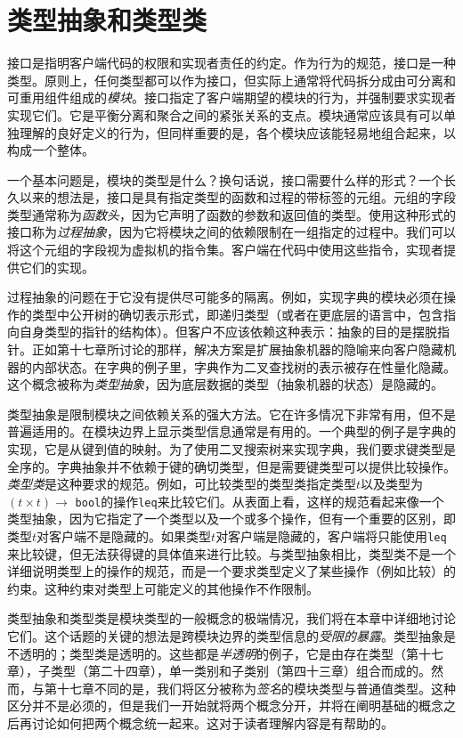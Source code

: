 
\chapter{类型抽象和类型类}
接口是指明客户端代码的权限和实现者责任的约定。作为行为的规范，接口是一种类型。原则上，任何类型都可以作为接口，但实际上通常将代码拆分成由可分离和可重用组件组成的\textit{模块}。接口指定了客户端期望的模块的行为，并强制要求实现者实现它们。它是平衡分离和聚合之间的紧张关系的支点。模块通常应该具有可以单独理解的良好定义的行为，但同样重要的是，各个模块应该能轻易地组合起来，以构成一个整体。

一个基本问题是，模块的类型是什么？换句话说，接口需要什么样的形式？一个长久以来的想法是，接口是具有指定类型的函数和过程的带标签的元组。元组的字段类型通常称为\textit{函数头}，因为它声明了函数的参数和返回值的类型。使用这种形式的接口称为\textit{过程抽象}，因为它将模块之间的依赖限制在一组指定的过程中。我们可以将这个元组的字段视为虚拟机的指令集。客户端在代码中使用这些指令，实现者提供它们的实现。

过程抽象的问题在于它没有提供尽可能多的隔离。例如，实现字典的模块必须在操作的类型中公开树的确切表示形式，即递归类型（或者在更底层的语言中，包含指向自身类型的指针的结构体）。但客户不应该依赖这种表示：抽象的目的是摆脱指针。正如第十七章所讨论的那样，解决方案是扩展抽象机器的隐喻来向客户隐藏机器的内部状态。在字典的例子里，字典作为二叉查找树的表示被存在性量化隐藏。这个概念被称为\textit{类型抽象}，因为底层数据的类型（抽象机器的状态）是隐藏的。

类型抽象是限制模块之间依赖关系的强大方法。它在许多情况下非常有用，但不是普遍适用的。在模块边界上显示类型信息通常是有用的。一个典型的例子是字典的实现，它是从键到值的映射。为了使用二叉搜索树来实现字典，我们要求键类型是全序的。字典抽象并不依赖于键的确切类型，但是需要键类型可以提供比较操作。\textit{类型类}是这种要求的规范。例如，可比较类型的类型类指定类型$t$以及类型为$(t \times t) \rightarrow$ \texttt{bool}的操作\texttt{leq}来比较它们。从表面上看，这样的规范看起来像一个类型抽象，因为它指定了一个类型以及一个或多个操作，但有一个重要的区别，即类型$t$对客户端不是隐藏的。如果类型$t$对客户端是隐藏的，客户端将只能使用\texttt{leq}来比较键，但无法获得键的具体值来进行比较。与类型抽象相比，类型类不是一个详细说明类型上的操作的规范，而是一个要求类型定义了某些操作（例如比较）的约束。这种约束对类型上可能定义的其他操作不作限制。

类型抽象和类型类是模块类型的一般概念的极端情况，我们将在本章中详细地讨论它们。这个话题的关键的想法是跨模块边界的类型信息的\textit{受限的暴露}。类型抽象是不透明的；类型类是透明的。这些都是\textit{半透明}的例子，它是由存在类型（第十七章），子类型（第二十四章），单一类别和子类别（第四十三章）组合而成的。然而，与第十七章不同的是，我们将区分被称为\textit{签名}的模块类型与普通值类型。这种区分并不是必须的，但是我们一开始就将两个概念分开，并将在阐明基础的概念之后再讨论如何把两个概念统一起来。这对于读者理解内容是有帮助的。

